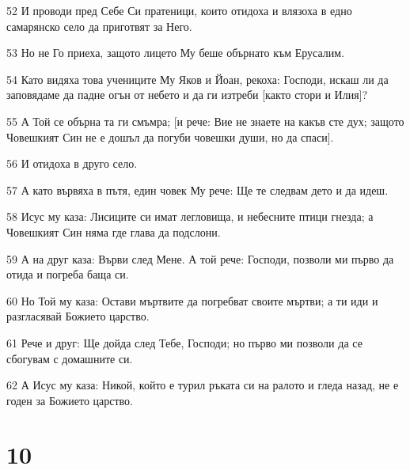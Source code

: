 \par 52 И проводи пред Себе Си пратеници, които отидоха и влязоха в едно самарянско село да приготвят за Него.
\par 53 Но не Го приеха, защото лицето Му беше обърнато към Ерусалим.
\par 54 Като видяха това учениците Му Яков и Йоан, рекоха: Господи, искаш ли да заповядаме да падне огън от небето и да ги изтреби [както стори и Илия]?
\par 55 А Той се обърна та ги смъмра; [и рече: Вие не знаете на какъв сте дух; защото Човешкият Син не е дошъл да погуби човешки души, но да спаси].
\par 56 И отидоха в друго село.
\par 57 А като вървяха в пътя, един човек Му рече: Ще те следвам дето и да идеш.
\par 58 Исус му каза: Лисиците си имат легловища, и небесните птици гнезда; а Човешкият Син няма где глава да подслони.
\par 59 А на друг каза: Върви след Мене. А той рече: Господи, позволи ми първо да отида и погреба баща си.
\par 60 Но Той му каза: Остави мъртвите да погребват своите мъртви; а ти иди и разгласявай Божието царство.
\par 61 Рече и друг: Ще дойда след Тебе, Господи; но първо ми позволи да се сбогувам с домашните си.
\par 62 А Исус му каза: Никой, който е турил ръката си на ралото и гледа назад, не е годен за Божието царство.

\chapter{10}

